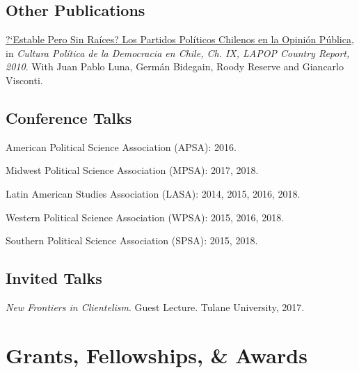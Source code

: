 \documentclass[letterpaper]{article}
\renewenvironment{itemize}{
  \begin{list}{}{
    \setlength{\leftmargin}{1.5em}
  }
}{
  \end{list}
}
\begin{document}
\subsection*{Other Publications}

\begin{itemize}
\item[$\bullet$] \href{http://www.vanderbilt.edu/lapop/chile/Chile-2010-cultura-politica.pdf}{?`Estable Pero Sin Ra\'ices? Los Partidos Pol\'iticos Chilenos en la Opini\'on P\'ublica}, in \emph{Cultura Pol\'itica de la Democracia en Chile, Ch. IX, LAPOP Country Report, 2010}. With Juan Pablo Luna, Germ\'an Bidegain, Roody Reserve and Giancarlo Visconti.
\end{itemize}

\subsection*{Conference Talks}

\begin{itemize}
\item American Political Science Association (APSA): 2016.
\item Midwest Political Science Association (MPSA): 2017, 2018.
\item Latin American Studies Association (LASA): 2014, 2015, 2016, 2018.
\item Western Political Science Association (WPSA): 2015, 2016, 2018.
\item Southern Political Science Association (SPSA): 2015, 2018.
\end{itemize}


\subsection*{Invited Talks}
\begin{itemize}
\item \emph{New Frontiers in Clientelism}. Guest Lecture. Tulane University, 2017.
\end{itemize}

\section*{Grants, Fellowships, \& Awards}
\end{document}
